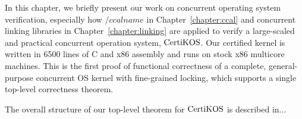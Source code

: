 



In this chapter, we briefly present our work on concurrent operating system verification, especially 
how $/ccalname$ in Chapter~\ref{chapter:ccal} and concurrent linking libraries in Chapter~\ref{chapter:linking} are applied 
to verify a large-scaled and practical concurrent operation system, $\mathrm{CertiKOS}$.
Our certified kernel is written in 6500 lines of C and x86 assembly
and runs on stock x86 multicore machines. This is
the first proof of functional correctness of a complete,
general-purpose concurrent OS kernel with fine-grained locking,
which supports a single top-level correctness theorem. 
%
%

The overall structure of our top-level theorem for $\mathrm{CertiKOS}$ is described in...

